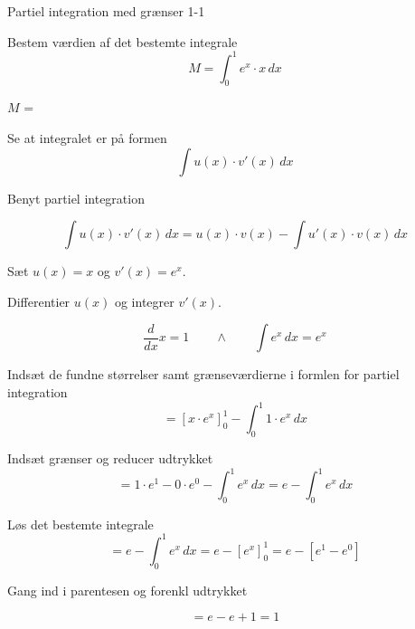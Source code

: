 \documentclass{article}
\begin{document}
\tableofcontents

\newpage

\begin{exercise}{Partiel integration med grænser 1-1}
	
	
	Bestem værdien af det bestemte integrale
	\[
	M = \int_0^1 e^x \cdot x \, dx
	\]
	
	$M$ =  \\
	
	
	\hint
	
	Se at integralet er på formen
	\[
	\int u(x) \cdot v'(x) \, dx
	\]
	
	\hint
	
	Benyt partiel integration
	
	\hint
	\[
	\int u(x) \cdot v'(x)\, dx = u(x) \cdot v(x) - \int u'(x) \cdot v(x) \, dx
	\]
	\hint
	
	Sæt $u(x) = x$ og $v'(x) = e^x$.
	
	
	\hint
	
	Differentier $u(x)$ og integrer $v'(x)$.
	
	\hint
	\[
	\frac{d}{dx}x = 1 \qquad \wedge \qquad \int e^x \, dx = e^x
	\]
	
	\hint
	
	Indsæt de fundne størrelser samt grænseværdierne i formlen for partiel integration 
	\[
	= \left[x \cdot e^x\right]_{0}^{1} - \int_{0}^{1} 1 \cdot e^x \, dx
	\]
	
	\hint
	
	Indsæt grænser og reducer udtrykket
	\[
	= 1 \cdot e^1 - 0 \cdot e^0  - \int_{0}^{1} e^x \, dx = e - \int_{0}^{1} e^x \, dx
	\]
	
	\hint
	Løs det bestemte integrale
	\[
	= e - \int_{0}^{1} e^x \, dx = e - \left[ e^x  \right]_{0}^{1} = e - \left[ e^1 - e^0 \right]
	\]
	
	\hint
	Gang ind i parentesen og forenkl udtrykket
	
	\hint
	\[
	= e  - e +1	 = 1	
	\]
	
	
	
\end{exercise}

\newpage
\end{document}
